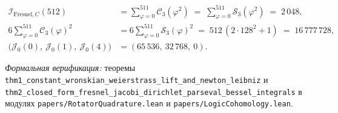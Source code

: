 \begin{theorem}
\begin{enumerate}[label=\textbf{\arabic*.},noitemsep]
  \begin{align}
    \mathcal{I}_{\mathrm{Fresnel},C}(512) &= \sum_{\varphi=0}^{511} \mathcal{C}_3(\varphi^2) \;=\; \sum_{\varphi=0}^{511} \mathcal{S}_3(\varphi^2) \;=\; 2\,048, \label{eq:mono-closed-integrals} \\
    6\sum_{\varphi=0}^{511} \mathcal{C}_3(\varphi)^2 &= 6\sum_{\varphi=0}^{511} \mathcal{S}_3(\varphi)^2 \;=\; 512\,(2\cdot 128^2 + 1) \;=\; 16\,777\,728, \label{eq:mono-parseval-sum} \\
    \bigl(\mathcal{J}_0(0),\ \mathcal{J}_0(1),\ \mathcal{J}_0(4)\bigr) &= (65\,536,\ 32\,768,\ 0). \label{eq:mono-bessel-sum}
  \end{align}
\end{enumerate}
\emph{Формальная верификация:} теоремы \texttt{thm1\_\allowbreak constant\_\allowbreak wronskian\_\allowbreak weier\allowbreak strass\_\allowbreak lift\_\allowbreak and\_\allowbreak newton\_\allowbreak leibniz} и \texttt{thm2\_\allowbreak closed\_\allowbreak form\_\allowbreak fresnel\_\allowbreak jacobi\_\allowbreak dirichlet\_\allowbreak parseval\_\allowbreak bessel\_\allowbreak integrals} в модулях \texttt{papers/\allowbreak Rotator\allowbreak Quadrature.lean} и \texttt{papers/\allowbreak Logic\allowbreak Cohomology.lean}.
\end{theorem}

